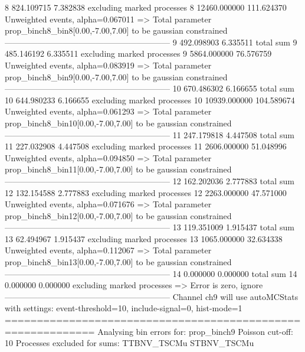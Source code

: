 8          824.109715      7.382838        excluding marked processes    
8          12460.000000    111.624370      Unweighted events, alpha=0.067011
  => Total parameter prop_binch8_bin8[0.00,-7.00,7.00] to be gaussian constrained
------------------------------------------------------------
9          492.098903      6.335511        total sum                     
9          485.146192      6.335511        excluding marked processes    
9          5864.000000     76.576759       Unweighted events, alpha=0.083919
  => Total parameter prop_binch8_bin9[0.00,-7.00,7.00] to be gaussian constrained
------------------------------------------------------------
10         670.486302      6.166655        total sum                     
10         644.980233      6.166655        excluding marked processes    
10         10939.000000    104.589674      Unweighted events, alpha=0.061293
  => Total parameter prop_binch8_bin10[0.00,-7.00,7.00] to be gaussian constrained
------------------------------------------------------------
11         247.179818      4.447508        total sum                     
11         227.032908      4.447508        excluding marked processes    
11         2606.000000     51.048996       Unweighted events, alpha=0.094850
  => Total parameter prop_binch8_bin11[0.00,-7.00,7.00] to be gaussian constrained
------------------------------------------------------------
12         162.202036      2.777883        total sum                     
12         132.154588      2.777883        excluding marked processes    
12         2263.000000     47.571000       Unweighted events, alpha=0.071676
  => Total parameter prop_binch8_bin12[0.00,-7.00,7.00] to be gaussian constrained
------------------------------------------------------------
13         119.351009      1.915437        total sum                     
13         62.494967       1.915437        excluding marked processes    
13         1065.000000     32.634338       Unweighted events, alpha=0.112067
  => Total parameter prop_binch8_bin13[0.00,-7.00,7.00] to be gaussian constrained
------------------------------------------------------------
14         0.000000        0.000000        total sum                     
14         0.000000        0.000000        excluding marked processes    
  => Error is zero, ignore      
------------------------------------------------------------
Channel ch9 will use autoMCStats with settings: event-threshold=10, include-signal=0, hist-mode=1
============================================================
Analysing bin errors for: prop_binch9
Poisson cut-off: 10
Processes excluded for sums: TTBNV_TSCMu STBNV_TSCMu
